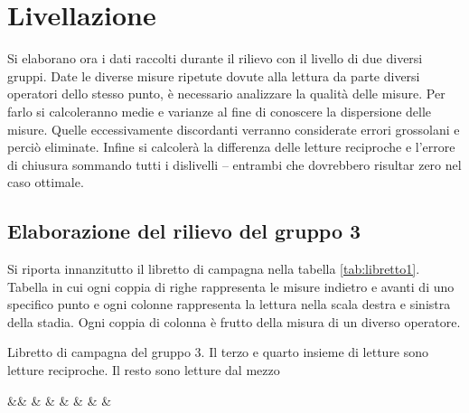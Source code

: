 \chapter{Livellazione}\label{cap:cap2}
\newcommand{\libretto}[3]{%
\begin{table}[htb]\footnotesize
\caption{#1}
\label{#2}
\centering
\csvreader[centered tabular=c@{}SSSSSSSS,
	table head=\toprule &$\mathbf{L_{dx}}$ & $\mathbf{L_{sx}}$ & $\mathbf{L_{dx}}$ %
	& $\mathbf{L_{sx}}$ & $\mathbf{L_{dx}}$ & $\mathbf{L_{sx}}$ & $\mathbf{L_{dx}}$ & $\mathbf{L_{sx}}$ \\\midrule,
	table foot = \bottomrule]%
	{#3}{}%
	{&\csvcoli & \csvcolii & \csvcoliii & %
	\csvcoliv & \csvcolv & \csvcolvi & %
	\csvcolvii & \csvcolviii}
\end{table}}
\newcommand{\elaborazione}[3]{%
\begin{table}[htb]\footnotesize
\caption{#1}
\label{#2}
\centering
\csvreader[centered tabular=c@{}rSSSSSSSS,
	no head, %
	table head=\toprule &&$\mathbf{1}$ & $\mathbf{2}$ & $\mathbf{3}$ %
	& $\mathbf{4}$ & $\mathbf{5}$ & $\mathbf{6}$ & $\mathbf{7}$ & $\mathbf{8}$ \\\midrule,
	table foot = \bottomrule]%
	{#3}{}%
	{&\textbf{\csvcolix} & \csvcoli & \csvcolii & \csvcoliii & %
	\csvcoliv & \csvcolv & \csvcolvi & %
	\csvcolvii & \csvcolviii}
\end{table}}
Si elaborano ora i dati raccolti durante il rilievo con il livello di due diversi gruppi. Date le diverse misure ripetute dovute alla lettura da parte diversi operatori dello stesso punto, è necessario analizzare la qualità delle misure. 
Per farlo si calcoleranno medie e varianze al fine di conoscere la dispersione delle misure. 
Quelle eccessivamente discordanti verranno considerate errori grossolani e perciò eliminate. 
Infine si calcolerà la differenza delle letture reciproche e  l'errore di chiusura sommando tutti i dislivelli -- entrambi che dovrebbero risultar zero nel caso ottimale.
\section{Elaborazione del rilievo del gruppo 3}
Si riporta innanzitutto il libretto di campagna nella tabella \ref{tab:libretto1}.
Tabella in cui ogni coppia di righe rappresenta le misure indietro e avanti di uno specifico punto e ogni colonne rappresenta la lettura nella scala destra e sinistra della stadia.
Ogni coppia di colonna è frutto della misura di un diverso operatore. 
\libretto{Libretto di campagna del gruppo 3. Il terzo e quarto insieme di letture sono letture reciproche. Il resto sono letture dal mezzo}{tab:libretto1}{documents/livLibretto1.csv}

